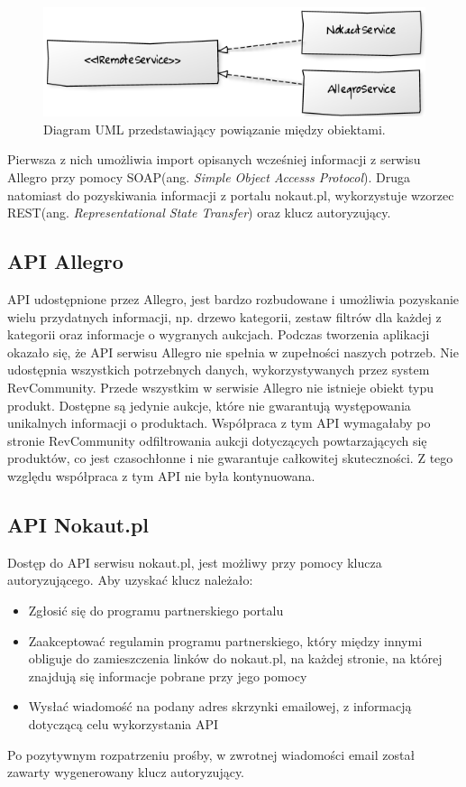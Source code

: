 \begin{figure}[h]
	\centering
	\includegraphics[scale=1]{images/uml_remote_service2.png}
	\caption{Diagram UML przedstawiający powiązanie między obiektami.}
\end{figure}

Pierwsza z nich umożliwia import opisanych wcześniej informacji z serwisu Allegro przy pomocy SOAP(ang. \textit{Simple Object Accesss Protocol}). Druga natomiast do pozyskiwania informacji z portalu nokaut.pl, wykorzystuje wzorzec REST(ang. \textit{Representational State Transfer}) oraz klucz autoryzujący.

\subsection{API Allegro}
API udostępnione przez Allegro, jest bardzo rozbudowane i umożliwia pozyskanie wielu przydatnych informacji, np. drzewo kategorii, zestaw filtrów dla każdej z kategorii oraz informacje o wygranych aukcjach.
Podczas tworzenia aplikacji okazało się, że API serwisu Allegro nie spełnia w zupełności naszych potrzeb.
Nie udostępnia wszystkich potrzebnych danych, wykorzystywanych przez system RevCommunity. Przede wszystkim w serwisie Allegro nie istnieje obiekt typu produkt. Dostępne są jedynie aukcje, które nie gwarantują występowania unikalnych informacji o produktach. Współpraca z tym API wymagałaby po stronie RevCommunity odfiltrowania aukcji dotyczących powtarzających się produktów, co jest czasochłonne i nie gwarantuje całkowitej skuteczności. Z tego względu współpraca z tym API nie była kontynuowana.

\subsection{API Nokaut.pl}
Dostęp do API serwisu nokaut.pl, jest możliwy przy pomocy klucza autoryzującego. Aby uzyskać klucz należało:
\begin{itemize}
\item Zgłosić się do programu partnerskiego portalu
\item Zaakceptować regulamin programu partnerskiego, który między innymi obliguje do zamieszczenia linków do nokaut.pl, na każdej stronie, na której znajdują się informacje pobrane przy jego pomocy
\item Wysłać wiadomość na podany adres skrzynki emailowej, z informacją dotyczącą celu wykorzystania API
\end{itemize}
Po pozytywnym rozpatrzeniu prośby, w zwrotnej wiadomości email został zawarty wygenerowany klucz autoryzujący.

